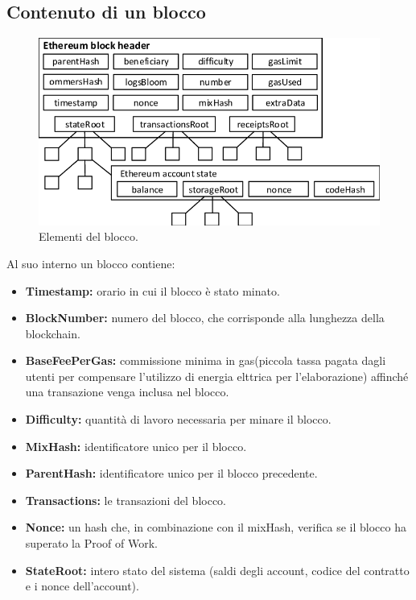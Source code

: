 \documentclass[a4paper,11pt]{report}
\begin{document}
\subsection{Contenuto di un blocco}
\begin{figure}[htbp] 
\begin{center}
\includegraphics[scale=0.45]{img/block.png}
\end{center}
\caption{Elementi del blocco. \cite{block}}
\end{figure} 

Al suo interno un blocco contiene:
\begin{itemize} %
\item \textbf{Timestamp:} orario in cui il blocco è stato minato.
\item \textbf{BlockNumber:} numero del blocco, che corrisponde alla lunghezza della blockchain.
\item \textbf{BaseFeePerGas:} commissione minima in gas(piccola tassa pagata dagli utenti per compensare l'utilizzo di energia elttrica per l'elaborazione) affinché una transazione venga inclusa nel blocco.
\item \textbf{Difficulty:} quantità di lavoro necessaria per minare il blocco.
\item \textbf{MixHash:} identificatore unico per il blocco.
\item \textbf{ParentHash:} identificatore unico per il blocco precedente.
\item \textbf{Transactions:} le transazioni del blocco.
\item \textbf{Nonce:} un hash che, in combinazione con il mixHash, verifica se il blocco ha superato la Proof of Work.
\item \textbf{StateRoot:} intero stato del sistema (saldi degli account, codice del contratto e i nonce dell'account).
\end{itemize}
\end{document}
